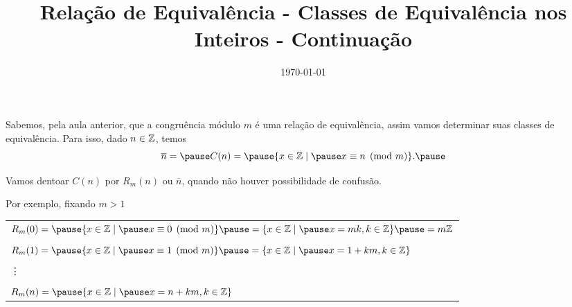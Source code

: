 \documentclass{beamer}
\title{Rela\c{c}\~ao de Equival\^encia - Classes de Equivalência nos Inteiros - Continuação}
\author[\autor]{\autor}
\institute[\instituto]{\instituto}
\date{\today}
\begin{document}
    \begin{frame}
        \maketitle
    \end{frame}


    \begin{frame}
        Sabemos, pela aula anterior, que a congru{\^e}ncia m{\'o}dulo $m$ {\'e} uma rela{\c c}{\~a}o de equival{\^e}ncia, \pause assim vamos determinar suas classes de equival{\^e}ncia. \pause Para isso, dado $n \in \mathbb{Z}$, temos\pause
        \[
            \overline{n} = \pause C(n) = \pause \{x \in \z \mid \pause x\equiv n \pmod{m}\}.\pause
        \]

        Vamos dentoar $C(n)$ \pause por $R_{m}(n)$ \pause ou $\overline{n}$, \pause quando n{\~a}o houver possibilidade de confus{\~a}o.\pause

        Por exemplo, fixando $m > 1$\pause
        \begin{center}
            \begin{tabular}{l}
                $R_{m}(0) = \pause \{x \in \z \mid \pause x\equiv 0 \pmod{m}\} \pause =\{x \in \z \mid \pause x = mk, k \in \z\}\pause = m\z$\pause\\
                \\
                $R_{m}(1) = \pause \{x \in \z \mid \pause x\equiv 1 \pmod{m}\} \pause = \{x \in \z \mid \pause x = 1 + km, k \in \z \}$\pause \\
                \\
                \vdots\\
                \\
                $R_{m}(n) = \pause \{x \in \z \mid \pause x = n + km, k \in \z \}$\pause    
            \end{tabular}
            
        \end{center}
    \end{frame}
\end{document}
